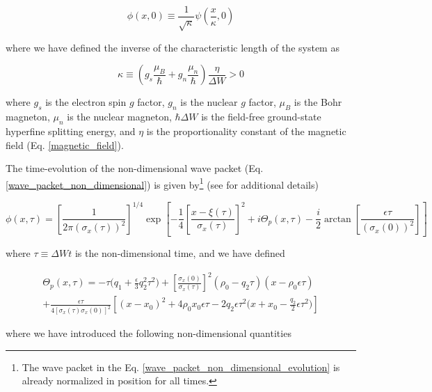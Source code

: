 \documentclass{article}
\begin{document}
\begin{equation}\label{wave_packet_non_dimensional}
\phi(x,0) \equiv \frac{1}{\sqrt{\kappa}} \psi(\frac{x}{\kappa}, 0)
\end{equation}

where we have defined the inverse of the characteristic length of the system as

\begin{equation}\label{kappa}
\kappa \equiv (g_{s}\frac{\mu_{B}}{\hbar} + g_{n}\frac{\mu_{n}}{\hbar}) \frac{\eta}{\Delta W} > 0
\end{equation}

where $g_{s}$ is the electron spin $g$ factor, $g_{n}$ is the nuclear $g$ factor, $\mu_{B}$ is the Bohr magneton, $\mu_{n}$ is the nuclear magneton, $\hbar \Delta W$ is the field-free ground-state hyperfine splitting energy, and $\eta$ is the proportionality constant of the magnetic field (Eq. \ref{magnetic_field}).

The time-evolution of the non-dimensional wave packet (Eq. \ref{wave_packet_non_dimensional}) is given by\footnote{The wave packet in the Eq. \ref{wave_packet_non_dimensional_evolution} is already normalized in position for all times.} (see \cite{Castanos2014} for additional details)

\begin{equation}\label{wave_packet_non_dimensional_evolution}
\phi(x,\tau) = 
\left[\frac{1}{2 \pi (\sigma_{x}(\tau))^2} \right]^{1/4} \exp \left[-\frac{1}{4} \left[\frac{x-\xi(\tau)}{\sigma_{x}(\tau)}\right]^{2}  + i\Theta_{p}(x, \tau) - \frac{i}{2}\arctan\left[\frac{\epsilon \tau}{(\sigma_{x}(0))^{2}}\right] \right]
\end{equation}

where $\tau\equiv \Delta W t$ is the non-dimensional time, and we have defined 

\begin{multline}\label{theta_p}
\Theta_{p}(x,\tau) = -\tau \bigg(q_{1} + \frac{\epsilon}{3} q_{2}^{2} \tau^{2}\bigg) + \left[\frac{\sigma_{x}(0)}{\sigma_{x}(\tau)} \right]^{2} (\rho_{0} - q_{2} \tau)(x-\rho_{0} \epsilon \tau) \\
+ \frac{\epsilon \tau}{4 [\sigma_{x}(\tau)\sigma_{x}(0)]^{2}} \left[(x-x_{0})^{2} + 4\rho_{0} x_{0} \epsilon \tau -2q_{2} \epsilon \tau^{2} \bigg(x+x_{0}- \frac{q_{2}}{2} \epsilon \tau^{2} \bigg)\right]
\end{multline}

where we have introduced the following non-dimensional quantities
\end{document}
